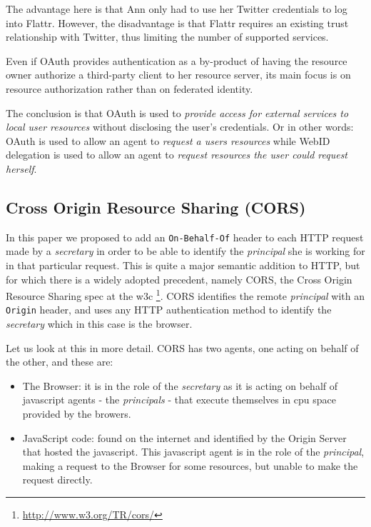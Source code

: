 \documentclass[a4paper]{llncs}
\begin{document}
The advantage here is that Ann only had to use her Twitter credentials to log into Flattr.  However, the disadvantage is that Flattr requires an existing trust relationship with Twitter, thus limiting the number of supported services.

Even if OAuth provides authentication as a by-product of having the resource owner authorize a third-party client to her resource server, its main focus is on resource authorization rather than on federated identity.

The conclusion is that OAuth is used to \textit{provide access for external services to local user resources} without disclosing the user's credentials.
Or in other words: OAuth is used to allow an agent to \textit{request a users resources} while WebID delegation is used to allow an agent to \textit{request resources the user could request herself}.


\subsection{Cross Origin Resource Sharing (CORS)}

In this paper we proposed to add an \lstinline|On-Behalf-Of| header to each HTTP request made by a \textit{secretary} in order to be able to identify the \textit{principal} she is working for in that particular request.
This is quite a major semantic addition to HTTP, but for which there is a widely adopted precedent, namely CORS, the Cross Origin Resource Sharing spec at the w3c \footnote{\url{http://www.w3.org/TR/cors/}}.
CORS  identifies the remote \textit{principal} with an \lstinline|Origin| header, and uses any HTTP authentication method to identify the \textit{secretary} which in this case is the browser.

Let us look at this in more detail.
CORS has two agents, one acting on behalf of the other, and these are: 
\begin{itemize}
  \item The Browser: it is in the role of the \textit{secretary} as it is acting on behalf of javascript agents - the \textit{principals} - that execute themselves in cpu space provided by the browers.
  \item JavaScript code: found on the internet and identified by the Origin Server that hosted the javascript. This javascript agent is in the role of the \textit{principal}, making a request to the Browser for some resources, but unable to make the request directly.
\end{itemize}
\end{document}
